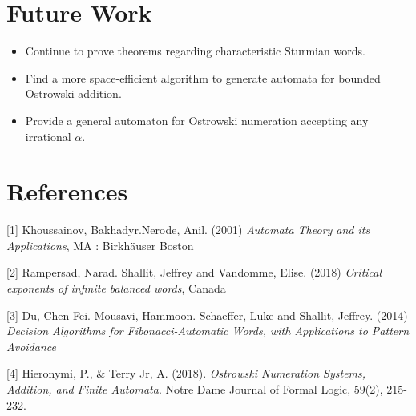 \documentclass[landscape]{sciposter}
\begin{document}
\begin{multicols}{3}
\section*{Future Work}
\begin{itemize}
\item Continue to prove theorems regarding characteristic Sturmian words.
\item Find a more space-efficient algorithm to generate automata for bounded Ostrowski addition.
\item Provide a general automaton for Ostrowski numeration accepting any irrational $\alpha$.
\end{itemize}

\vspace*{-10pt}  %
\section*{References}

{\footnotesize [1] Khoussainov, Bakhadyr.Nerode, Anil. (2001) \emph{Automata Theory and its Applications}, MA : Birkh\"auser Boston
}

{\footnotesize [2] Rampersad, Narad. Shallit, Jeffrey and  Vandomme, Elise. (2018) \emph{Critical exponents of infinite balanced words}, Canada
}

{\footnotesize [3] Du, Chen Fei. Mousavi, Hammoon. Schaeffer, Luke and Shallit, Jeffrey. (2014) \emph{Decision Algorithms for Fibonacci-Automatic Words, with Applications to Pattern Avoidance}
}

{\footnotesize [4] Hieronymi, P., \& Terry Jr, A. (2018). \emph{Ostrowski Numeration Systems, Addition, and Finite Automata}. Notre Dame Journal of Formal Logic, 59(2), 215-232.
}

\vspace*{2cm} %
\centerline{\emph{
}}
\end{multicols}
\end{document}
